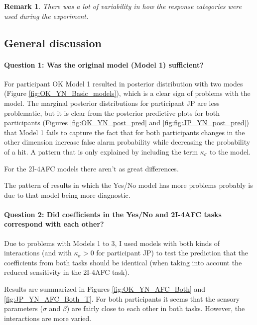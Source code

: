 \documentclass{article}\usepackage{knitr}
\newtheorem{remark}{Remark}
\begin{document}
\begin{remark}
There was a lot of variability in how the response categories were used during the experiment.
\end{remark}

\subsection{General discussion}

\paragraph{Question 1: Was the original model (Model 1) sufficient?}

For participant OK Model 1 resulted in posterior distribution with two modes (Figure \ref{fig:OK_YN_Basic_models}), which is a clear sign of problems with the model. The marginal posterior distributions for participant JP are less problematic, but it is clear from the posterior predictive plots for both participants (Figures \ref{fig:OK_YN_post_pred} and \ref{fig:fig:JP_YN_post_pred}) that Model 1 fails to capture the fact that for both participants changes in the other dimension increase false alarm probability while decreasing the probability of a  hit. A pattern that is only explained by including the term $\kappa_{\sigma}$ to the model. 

For the 2I-4AFC models there aren't as great differences. 

The pattern of results in which the Yes/No model has more problems probably is due to that model being more diagnostic.    

\paragraph{Question 2: Did coefficients in the Yes/No and 2I-4AFC tasks correspond with each other?}

Due to problems with Models 1 to 3, I used models with both kinds of interactions (and with $\kappa_{\sigma} > 0$ for participant JP) to test the prediction that the coefficients from both tasks should be identical (when taking into account the reduced sensitivity in the 2I-4AFC task).

Results are summarized in Figures \ref{fig:OK_YN_AFC_Both} and \ref{fig:JP_YN_AFC_Both_T}. For both participants it seems that the sensory parameters ($\sigma$ and $\beta$) are fairly close to each other in both tasks. However, the interactions are more varied. 
\end{document}

